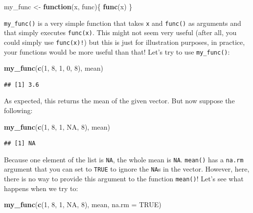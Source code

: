 \documentclass[]{gitbook}
\newenvironment{Shaded}{\begin{snugshade}}{\end{snugshade}}
\newcommand{\ControlFlowTok}[1]{\textcolor[rgb]{0.13,0.29,0.53}{\textbf{#1}}}
\newcommand{\DataTypeTok}[1]{\textcolor[rgb]{0.13,0.29,0.53}{#1}}
\newcommand{\DecValTok}[1]{\textcolor[rgb]{0.00,0.00,0.81}{#1}}
\newcommand{\KeywordTok}[1]{\textcolor[rgb]{0.13,0.29,0.53}{\textbf{#1}}}
\newcommand{\NormalTok}[1]{#1}
\newcommand{\OtherTok}[1]{\textcolor[rgb]{0.56,0.35,0.01}{#1}}
\newcommand{\StringTok}[1]{\textcolor[rgb]{0.31,0.60,0.02}{#1}}
\begin{document}
\begin{Shaded}
\begin{Highlighting}[]
\NormalTok{my_func <-}\StringTok{ }\ControlFlowTok{function}\NormalTok{(x, func)\{}
  \KeywordTok{func}\NormalTok{(x)}
\NormalTok{\}}
\end{Highlighting}
\end{Shaded}

\texttt{my\_func()} is a very simple function that takes \texttt{x} and \texttt{func()} as arguments and that simply
executes \texttt{func(x)}. This might not seem very useful (after all, you could simply use \texttt{func(x)!}) but
this is just for illustration purposes, in practice, your functions would be more useful than that!
Let's try to use \texttt{my\_func()}:

\begin{Shaded}
\begin{Highlighting}[]
\KeywordTok{my_func}\NormalTok{(}\KeywordTok{c}\NormalTok{(}\DecValTok{1}\NormalTok{, }\DecValTok{8}\NormalTok{, }\DecValTok{1}\NormalTok{, }\DecValTok{0}\NormalTok{, }\DecValTok{8}\NormalTok{), mean)}
\end{Highlighting}
\end{Shaded}

\begin{verbatim}
## [1] 3.6
\end{verbatim}

As expected, this returns the mean of the given vector. But now suppose the following:

\begin{Shaded}
\begin{Highlighting}[]
\KeywordTok{my_func}\NormalTok{(}\KeywordTok{c}\NormalTok{(}\DecValTok{1}\NormalTok{, }\DecValTok{8}\NormalTok{, }\DecValTok{1}\NormalTok{, }\OtherTok{NA}\NormalTok{, }\DecValTok{8}\NormalTok{), mean)}
\end{Highlighting}
\end{Shaded}

\begin{verbatim}
## [1] NA
\end{verbatim}

Because one element of the list is \texttt{NA}, the whole mean is \texttt{NA}. \texttt{mean()} has a \texttt{na.rm} argument
that you can set to \texttt{TRUE} to ignore the \texttt{NA}s in the vector. However, here, there is no way to
provide this argument to the function \texttt{mean()}! Let's see what happens when we try to:

\begin{Shaded}
\begin{Highlighting}[]
\KeywordTok{my_func}\NormalTok{(}\KeywordTok{c}\NormalTok{(}\DecValTok{1}\NormalTok{, }\DecValTok{8}\NormalTok{, }\DecValTok{1}\NormalTok{, }\OtherTok{NA}\NormalTok{, }\DecValTok{8}\NormalTok{), mean, }\DataTypeTok{na.rm =} \OtherTok{TRUE}\NormalTok{)}
\end{Highlighting}
\end{Shaded}
\end{document}
